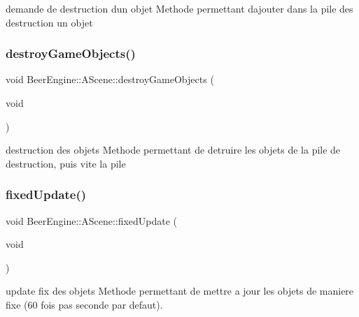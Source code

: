 demande de destruction d\textquotesingle{}un objet Methode permettant d\textquotesingle{}ajouter dans la pile des destruction un objet 

\mbox{\label{class_beer_engine_1_1_a_scene_a3f8b7e31b089fd39ed8c6d1505a91c16}} 
\subsubsection{\texorpdfstring{destroy\+Game\+Objects()}{destroyGameObjects()}}
{\footnotesize\ttfamily void Beer\+Engine\+::\+A\+Scene\+::destroy\+Game\+Objects (\begin{DoxyParamCaption}\item[{void}]{ }\end{DoxyParamCaption})}



destruction des objets Methode permettant de detruire les objets de la pile de destruction, puis vite la pile 

\mbox{\label{class_beer_engine_1_1_a_scene_a98c0b2bca184f5ba2c7a1660bead32cf}} 
\subsubsection{\texorpdfstring{fixed\+Update()}{fixedUpdate()}}
{\footnotesize\ttfamily void Beer\+Engine\+::\+A\+Scene\+::fixed\+Update (\begin{DoxyParamCaption}\item[{void}]{ }\end{DoxyParamCaption})}



update fix des objets Methode permettant de mettre a jour les objets de maniere fixe (60 fois pas seconde par defaut). 

\mbox{\label{class_beer_engine_1_1_a_scene_ae551bf1b3e7cf87cc2de4b6859732e81}} 
